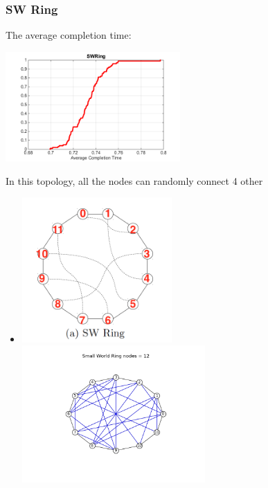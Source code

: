 \documentclass[11pt]{article}
\begin{document}
\subsubsection{SW Ring}
The average completion time: \\
\centerline{\includegraphics[width=0.5\textwidth]{figure/picture/SWRing.png}}
In this topology, all the nodes can randomly connect 4 other 
\begin{itemize}
	\item \centerline{}
	\includegraphics[width=0.45\textwidth]{figure/draw/SWRing_original}
	\includegraphics[width=0.55\textwidth]{figure/draw/SWRing.png}
\end{itemize}
\end{document}
